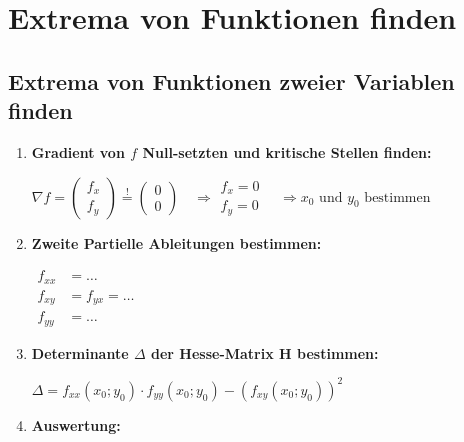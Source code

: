 \newpage
\section{Extrema von Funktionen finden}

\subsection{Extrema von Funktionen zweier Variablen finden}

\begin{enumerate}[itemsep=1ex]
    \item \textbf{Gradient von $f$ Null-setzten und kritische Stellen finden:}

    $\nabla f=
    \begin{pmatrix}
        f_x\\
        f_y
    \end{pmatrix} \stackrel{!}{=}
    \begin{pmatrix}
        0\\
        0
    \end{pmatrix}
    \, \, \, \, \, \,
    \Rightarrow 
    \begin{matrix}
        f_{x}=0\\
        f_{y}=0
    \end{matrix}
    \, \, \, \, \, \,
    \Rightarrow
    x_0 \text{ und } y_0 \text{ bestimmen}$

    \item \textbf{Zweite Partielle Ableitungen bestimmen:}
    
    $\begin{aligned}
        f_{xx} &= \dots\\
        f_{xy} &= f_{yx} = \dots\\
        f_{yy} &= \dots
    \end{aligned}$
    

    \item \textbf{Determinante $\Delta$ der Hesse-Matrix H bestimmen:}
    
    $\Delta = f_{xx}(x_0;y_0) \cdot f_{yy}(x_0;y_0) - \left(f_{xy}(x_0;y_0)\right)^2 $

    \item \textbf{Auswertung:}
    

\end{enumerate}
